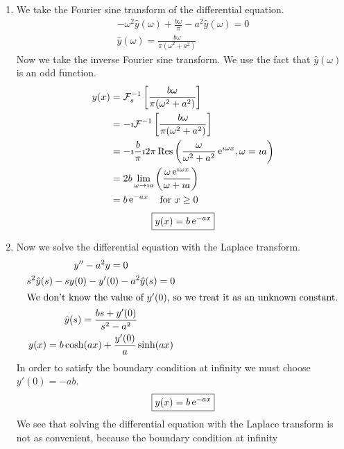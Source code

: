 {%
\begin{Solution}
  \label{solution ode ft fst y-a2y=0}
  \begin{enumerate}
  \item
    We take the Fourier sine transform of the differential equation.
    \begin{gather*}
      - \omega^2 \hat{y}(\omega) + \frac{b \omega}{\pi} - a^2 \hat{y}(\omega)= 0 
      \\
      \hat{y}(\omega) = \frac{b \omega}{\pi (\omega^2 + a^2)}
    \end{gather*}
    Now we take the inverse Fourier sine transform.  We use the fact that
    $\hat{y}(\omega)$ is an odd function.
    \begin{align*}
      y(x)    
      &= \mathcal{F}_s^{-1} \left[ \frac{b \omega}{\pi (\omega^2 + a^2)} \right] 
      \\
      &= - \imath \mathcal{F}^{-1} \left[ \frac{b \omega}{\pi (\omega^2 + a^2)} \right] 
      \\
      &= - \imath \frac{b}{\pi} \imath 2 \pi \mathop{\mathrm{Res}}\nolimits \left( \frac{\omega}{\omega^2 + a^2}
        \mathop{\mathrm{e}}\nolimits^{\imath \omega x}, \omega = \imath a \right) 
      \\
      &= 2 b \lim_{\omega \to \imath a} \left( \frac{\omega \mathop{\mathrm{e}}\nolimits^{\imath \omega x}}{\omega + \imath a} \right) 
      \\
      &= b \mathop{\mathrm{e}}\nolimits^{-a x} \quad \mathrm{for}\ x \geq 0
    \end{align*}
    \[
    \boxed{
      y(x) = b \mathop{\mathrm{e}}\nolimits^{-a x}
      }
    \]
  \item
    Now we solve the differential equation with the Laplace transform.
    \begin{gather*}
      y'' - a^2 y = 0 
      \\
      s^2 \hat{y}(s) - s y(0) - y'(0) - a^2 \hat{y}(s) = 0 
      \\
      \intertext{We don't know the value of $y'(0)$, so we treat it 
        as an unknown constant.}
      \hat{y}(s) = \frac{b s + y'(0)}{s^2 - a^2} 
      \\
      y(x) = b \cosh(a x) + \frac{y'(0)}{a} \sinh(a x) 
    \end{gather*}
    In order to satisfy the boundary condition at infinity we must choose
    $y'(0) = -a b$.
    \[
    \boxed{
      y(x) = b \mathop{\mathrm{e}}\nolimits^{-a x}
      }
    \]
    We see that solving the differential equation with the Laplace transform
    is not as convenient, because the boundary condition at infinity

\end{enumerate}
\end{Solution}}
